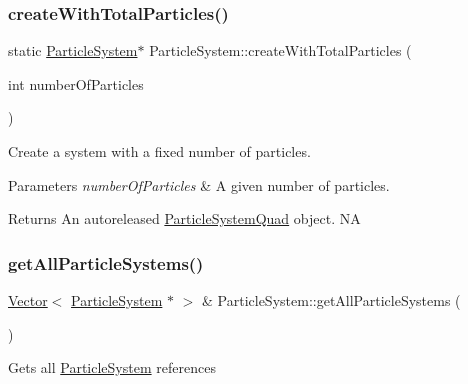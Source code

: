 \subsubsection{\texorpdfstring{create\+With\+Total\+Particles()}{createWithTotalParticles()}\hspace{0.1cm}{\footnotesize\ttfamily [2/2]}}
{\footnotesize\ttfamily static \hyperlink{classParticleSystem}{Particle\+System}$\ast$ Particle\+System\+::create\+With\+Total\+Particles (\begin{DoxyParamCaption}\item[{int}]{number\+Of\+Particles }\end{DoxyParamCaption})\hspace{0.3cm}{\ttfamily [static]}}

Create a system with a fixed number of particles.


\begin{DoxyParams}{Parameters}
{\em number\+Of\+Particles} & A given number of particles. \\
\hline
\end{DoxyParams}
\begin{DoxyReturn}{Returns}
An autoreleased \hyperlink{classParticleSystemQuad}{Particle\+System\+Quad} object.  NA 
\end{DoxyReturn}
\mbox{\label{classParticleSystem_a35d125accbf0d470adf1c51b5628e583}} 
\subsubsection{\texorpdfstring{get\+All\+Particle\+Systems()}{getAllParticleSystems()}}
{\footnotesize\ttfamily \hyperlink{classVector}{Vector}$<$ \hyperlink{classParticleSystem}{Particle\+System} $\ast$ $>$ \& Particle\+System\+::get\+All\+Particle\+Systems (\begin{DoxyParamCaption}{ }\end{DoxyParamCaption})\hspace{0.3cm}{\ttfamily [static]}}

Gets all \hyperlink{classParticleSystem}{Particle\+System} references \mbox{\label{classParticleSystem_a0dbc31c17a275c2e97ce9734e41c4b4d}} 

